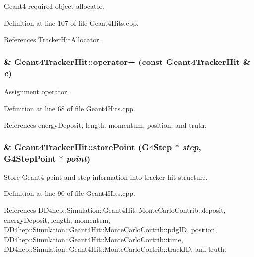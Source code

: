Geant4 required object allocator. 

Definition at line 107 of file Geant4Hits.cpp.

References TrackerHitAllocator.\hypertarget{class_d_d4hep_1_1_simulation_1_1_geant4_tracker_hit_aab16478430961e4ac76d82d15f07af58}{
\subsubsection[{operator=}]{ \& Geant4TrackerHit::operator= (const {\bf Geant4TrackerHit} \& {\em c})}}
\label{class_d_d4hep_1_1_simulation_1_1_geant4_tracker_hit_aab16478430961e4ac76d82d15f07af58}


Assignment operator. 

Definition at line 68 of file Geant4Hits.cpp.

References energyDeposit, length, momentum, position, and truth.\hypertarget{class_d_d4hep_1_1_simulation_1_1_geant4_tracker_hit_a1c59f0271ec61e504bf572ed4e9b2bb0}{
\subsubsection[{storePoint}]{ \& Geant4TrackerHit::storePoint (G4Step $\ast$ {\em step}, \/  G4StepPoint $\ast$ {\em point})}}
\label{class_d_d4hep_1_1_simulation_1_1_geant4_tracker_hit_a1c59f0271ec61e504bf572ed4e9b2bb0}


Store Geant4 point and step information into tracker hit structure. 

Definition at line 90 of file Geant4Hits.cpp.

References DD4hep::Simulation::Geant4Hit::MonteCarloContrib::deposit, energyDeposit, length, momentum, DD4hep::Simulation::Geant4Hit::MonteCarloContrib::pdgID, position, DD4hep::Simulation::Geant4Hit::MonteCarloContrib::time, DD4hep::Simulation::Geant4Hit::MonteCarloContrib::trackID, and truth.

